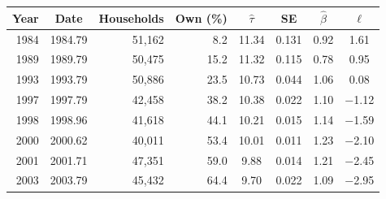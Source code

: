 \footnotesize
\begin{tabular}{rcrrcccc}
\toprule
Year & Date & Households & Own (\%) & $\hat\tau$ & SE & $\hat\beta$ & $\ell$ \\
\midrule
1984 & 1984.79 & 51,162 & 8.2 & 11.34 & 0.131 & 0.92 & 1.61 \\
1989 & 1989.79 & 50,475 & 15.2 & 11.32 & 0.115 & 0.78 & 0.95 \\
1993 & 1993.79 & 50,886 & 23.5 & 10.73 & 0.044 & 1.06 & 0.08 \\
1997 & 1997.79 & 42,458 & 38.2 & 10.38 & 0.022 & 1.10 & $-$1.12 \\
1998 & 1998.96 & 41,618 & 44.1 & 10.21 & 0.015 & 1.14 & $-$1.59 \\
2000 & 2000.62 & 40,011 & 53.4 & 10.01 & 0.011 & 1.23 & $-$2.10 \\
2001 & 2001.71 & 47,351 & 59.0 & 9.88 & 0.014 & 1.21 & $-$2.45 \\
2003 & 2003.79 & 45,432 & 64.4 & 9.70 & 0.022 & 1.09 & $-$2.95 \\
\bottomrule
\end{tabular}
